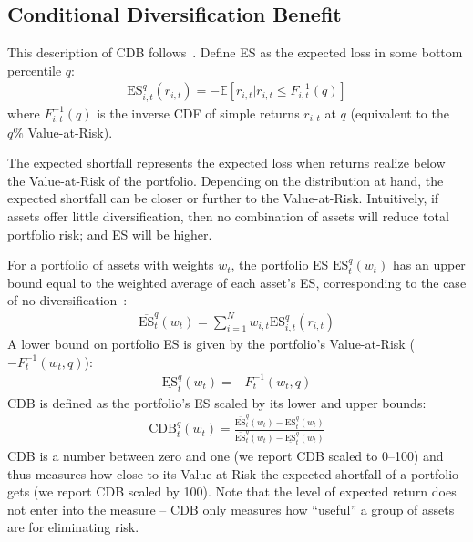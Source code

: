 \subsection{Conditional Diversification Benefit} %
\label{sub:conditional_diversification_benefit}

This description of CDB follows~\textcite{ChristoffersenErrunzaJacobLanglois2012}. Define ES as the expected loss in some bottom percentile $q$:
\begin{align}
    \text{ES}_{i,t}^q(r_{i,t}) = -\mathbb{E}[r_{i,t} | r_{i,t} \leq F_{i,t}^{-1}(q)]
\end{align}
where $F_{i,t}^{-1}(q)$ is the inverse CDF of simple returns $r_{i,t}$ at $q$ (equivalent to the $q\%$ Value-at-Risk). 

The expected shortfall represents the expected loss when returns realize below the Value-at-Risk of the portfolio. Depending on the distribution at hand, the expected shortfall can be closer or further to the Value-at-Risk. Intuitively, if assets offer little diversification, then no combination of assets will reduce total portfolio risk; and ES will be higher. 

For a portfolio of assets with weights $w_t$, the portfolio ES $\text{ES}_t^q(w_t)$ has an upper bound equal to the weighted average of each asset's ES, corresponding to the case of no diversification~\autocite{Artzner1999}:
\begin{align}
  \overline{\text{ES}}_t^q(w_t) = \sum_{i=1}^N w_{i,t} \text{ES}_{i,t}^q(r_{i,t})
\end{align}
A lower bound on portfolio ES is given by the portfolio's Value-at-Risk ($-F_{t}^{-1}(w_t, q)$):
\begin{align}
  \underline{\text{ES}}_t^q(w_t) = -F_{t}^{-1}(w_t, q)
\end{align}
CDB is defined as the portfolio's ES scaled by its lower and upper bounds:
\begin{align}
  \text{CDB}_t^q(w_t) = \frac{\overline{\text{ES}}_t^q(w_t) - \text{ES}_t^q(w_t)}{\overline{\text{ES}}_t^q(w_t) - \underline{\text{ES}}_t^q(w_t)}
\end{align}
CDB is a number between zero and one (we report CDB scaled to 0--100) and thus measures how close to its Value-at-Risk the expected shortfall of a portfolio gets (we report CDB scaled by 100). Note that the level of expected return does not enter into the measure -- CDB only measures how ``useful'' a group of assets are for eliminating risk.


